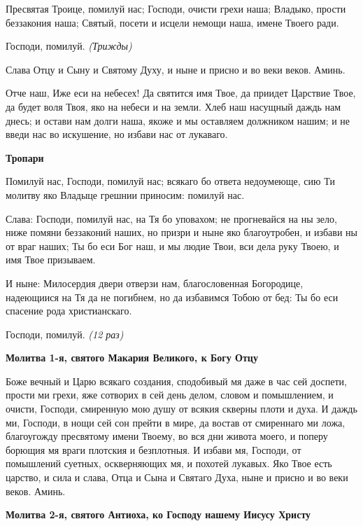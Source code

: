Пресвятая Троице, помилуй нас; Господи, очисти грехи наша; Владыко, прости беззакония наша; Святый, посети и исцели немощи наша, имене Твоего ради.


Господи, помилуй. \itshape (Трижды)\normalfont{}


Слава Отцу и Сыну и Святому Духу, и ныне и присно и во веки веков. Аминь.





Отче наш, Иже еси на небесех! Да святится имя Твое, да приидет Царствие Твое, да будет воля Твоя, яко на небеси и на земли. Хлеб наш насущный даждь нам днесь; и остави нам долги наша, якоже и мы оставляем должником нашим; и не введи нас во искушение, но избави нас от лукаваго.


\medskip
\bfseries Тропари\normalfont{}


Помилуй нас, Господи, помилуй нас; всякаго бо ответа недоумеюще, сию Ти молитву яко Владыце грешнии приносим: помилуй нас.


Слава: Господи, помилуй нас, на Тя бо уповахом; не прогневайся на ны зело, ниже помяни беззаконий наших, но призри и ныне яко благоутробен, и избави ны от враг наших; Ты бо еси Бог наш, и мы людие Твои, вси дела руку Твоею, и имя Твое призываем.


И ныне: Милосердия двери отверзи нам, благословенная Богородице, надеющиися на Тя да не погибнем, но да избавимся Тобою от бед: Ты бо еси спасение рода христианскаго.


Господи, помилуй. \itshape (12 раз)\normalfont{}


\medskip
\bfseries Молитва 1-я, святого Макария Великого, к Богу Отцу\normalfont{}


Боже вечный и Царю всякаго создания, сподобивый мя даже в час сей доспети, прости ми грехи, яже сотворих в сей день делом, словом и помышлением, и очисти, Господи, смиренную мою душу от всякия скверны плоти и духа. И даждь ми, Господи, в нощи сей сон прейти в мире, да востав от смиреннаго ми ложа, благоугожду пресвятому имени Твоему, во вся дни живота моего, и поперу борющия мя враги плотския и безплотныя. И избави мя, Господи, от помышлений суетных, оскверняющих мя, и похотей лукавых. Яко Твое есть царство, и сила и слава, Отца и Сына и Святаго Духа, ныне и присно и во веки веков. Аминь.


\medskip
\bfseries Молитва 2-я, святого Антиоха, ко Господу нашему Иисусу Христу\normalfont{}


